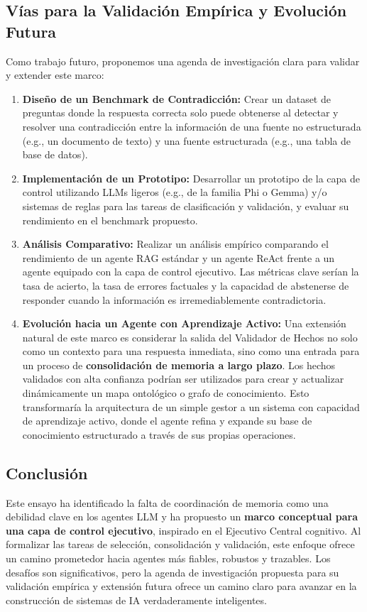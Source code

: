 \documentclass[conference]{IEEEtran}
\begin{document}
\subsection{Vías para la Validación Empírica y Evolución Futura}
Como trabajo futuro, proponemos una agenda de investigación clara para validar y extender este marco:
\begin{enumerate}
    \item \textbf{Diseño de un Benchmark de Contradicción:} Crear un dataset de preguntas donde la respuesta correcta solo puede obtenerse al detectar y resolver una contradicción entre la información de una fuente no estructurada (e.g., un documento de texto) y una fuente estructurada (e.g., una tabla de base de datos).
    \item \textbf{Implementación de un Prototipo:} Desarrollar un prototipo de la capa de control utilizando LLMs ligeros (e.g., de la familia Phi o Gemma) y/o sistemas de reglas para las tareas de clasificación y validación, y evaluar su rendimiento en el benchmark propuesto.
    \item \textbf{Análisis Comparativo:} Realizar un análisis empírico comparando el rendimiento de un agente RAG estándar y un agente ReAct frente a un agente equipado con la capa de control ejecutivo. Las métricas clave serían la tasa de acierto, la tasa de errores factuales y la capacidad de abstenerse de responder cuando la información es irremediablemente contradictoria.
    \item \textbf{Evolución hacia un Agente con Aprendizaje Activo:} Una extensión natural de este marco es considerar la salida del Validador de Hechos no solo como un contexto para una respuesta inmediata, sino como una entrada para un proceso de \textbf{consolidación de memoria a largo plazo}. Los hechos validados con alta confianza podrían ser utilizados para crear y actualizar dinámicamente un mapa ontológico o grafo de conocimiento. Esto transformaría la arquitectura de un simple gestor a un sistema con capacidad de aprendizaje activo, donde el agente refina y expande su base de conocimiento estructurado a través de sus propias operaciones.
\end{enumerate}

\subsection{Conclusión}
Este ensayo ha identificado la falta de coordinación de memoria como una debilidad clave en los agentes LLM y ha propuesto un \textbf{marco conceptual para una capa de control ejecutivo}, inspirado en el Ejecutivo Central cognitivo. Al formalizar las tareas de selección, consolidación y validación, este enfoque ofrece un camino prometedor hacia agentes más fiables, robustos y trazables. Los desafíos son significativos, pero la agenda de investigación propuesta para su validación empírica y extensión futura ofrece un camino claro para avanzar en la construcción de sistemas de IA verdaderamente inteligentes.
\end{document}
